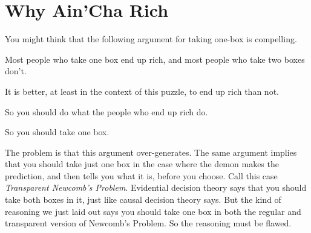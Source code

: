 \section{Why Ain'Cha Rich}
You might think that the following argument for taking one-box is compelling.

\begin{enumerate*}
\item Most people who take one box end up rich, and most people who take two boxes don't.
\item It is better, at least in the context of this puzzle, to end up rich than not.
\item So you should do what the people who end up rich do.
\item So you should take one box.
\end{enumerate*}

\noindent The problem is that this argument over-generates. The same argument implies that you should take just one box in the case where the demon makes the prediction, and then tells you what it is, before you choose. Call this case \textit{Transparent Newcomb's Problem}. Evidential decision theory says that you should take both boxes in it, just like causal decision theory says. But the kind of reasoning we just laid out says you should take one box in both the regular and transparent version of Newcomb's Problem. So the reasoning must be flawed.

